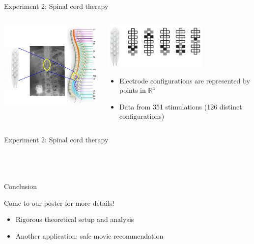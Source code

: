 \documentclass[xetex,10pt,mathserif,handout]{beamer}
\newlength\figureheight
\newlength\figurewidth
\begin{document}
\begin{frame}{Experiment 2: Spinal cord therapy}
\begin{columns}[c]
\begin{center}
\includegraphics[width=2.5in]{figures/config1.png}
\end{center}
\begin{center}
\includegraphics[width=2in]{figures/config2.png}
\vspace{2em}
\begin{itemize}
\item Electrode configurations are represented by points in $\mathbb{R}^4$
\vspace{1em}
\item Data from 351 stimulations (126 distinct configurations)
\end{itemize}
\end{center}
\end{columns}
\end{frame}

\begin{frame}{Experiment 2: Spinal cord therapy}
\begin{columns}[c]
\begin{center}
\setlength\figurewidth{2.5in}
\setlength\figureheight{1.7in}
\\[0.5em]

\end{center}
\centering
\setlength\figurewidth{2.5in}
\setlength\figureheight{3.7in}

\end{columns}
\end{frame}

\begin{frame}{Conclusion}

{\large Come to our poster for more details!}
\vspace{2em}
\begin{itemize}
  \item Rigorous theoretical setup and analysis
  \vspace{2em}
  \item Another application: safe movie recommendation
\end{itemize}
\end{frame}
\end{document}
